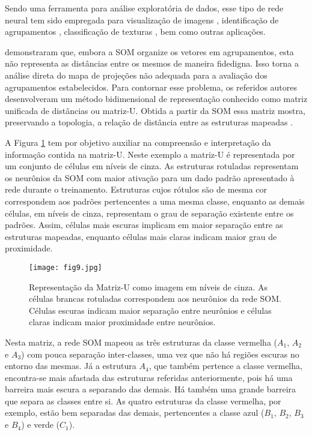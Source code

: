 Sendo uma ferramenta para análise exploratória de dados, esse tipo de rede neural tem sido empregada para visualização de imagens \cite{Strong2011774}, identificação de agrupamentos \cite{Kuroiwa200031}, classificação de texturas \cite{595364}, bem como outras aplicações.

 demonstraram que, embora a \ac{SOM} organize os vetores em agrupamentos, esta não representa as distâncias entre os mesmos de maneira fidedigna. Isso torna a análise direta do mapa de projeções não adequada para a avaliação dos agrupamentos estabelecidos. Para contornar esse problema, os referidos autores desenvolveram um método bidimensional de representação conhecido como matriz unificada de distâncias ou matriz-U. Obtida a partir da \ac{SOM} essa matriz mostra, preservando a topologia, a relação de distância entre as estruturas mapeadas \cite{Ultsch:1990}. 

A Figura \ref{fig:u-matrix} tem por objetivo auxiliar na compreensão e interpretação da informação contida na matriz-U. Neste exemplo a matriz-U é representada por um conjunto de células em níveis de cinza. As estruturas rotuladas representam os neurônios da \ac{SOM} com maior ativação para um dado padrão apresentado à rede durante o treinamento. Estruturas cujos rótulos são de mesma cor correspondem aos padrões pertencentes a uma mesma classe, enquanto as demais células, em níveis de cinza, representam o grau de separação existente entre os padrões. Assim, células mais escuras implicam em maior separação entre as estruturas mapeadas, enquanto células mais claras indicam maior grau de proximidade. 

\begin{figure}[t]
  \caption{\label{fig:u-matrix} Representação da Matriz-U como imagem em níveis de cinza. As células brancas rotuladas correspondem aos neurônios da rede \ac{SOM}. Células escuras indicam maior separação entre neurônios e células claras indicam maior proximidade entre neurônios.}
  \centering
  \texttt{[image: fig9.jpg]}
\end{figure}

Nesta matriz, a rede \ac{SOM} mapeou as três estruturas da classe vermelha ($A_1$, $A_2$ e $A_3$) com pouca separação inter-classes, uma vez que não há regiões escuras no entorno das mesmas. Já a estrutura $A_4$, que também pertence a classe vermelha, encontra-se mais afastada das estruturas referidas anteriormente, pois há uma barreira mais escura a separando das demais. Há também uma grande barreira que separa as classes entre si. As quatro estruturas da classe vermelha, por exemplo, estão bem separadas das demais, pertencentes a classe azul ($B_1$, $B_2$, $B_3$ e $B_4$) e verde ($C_1$).

